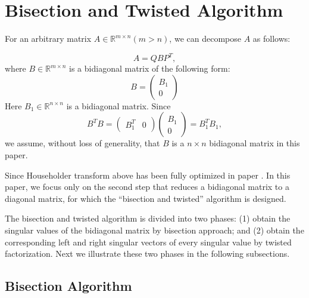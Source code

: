 \section{Bisection and Twisted Algorithm}
\label{sec:algorithm}
For an arbitrary matrix $A\in \mathbb{R}^{m \times n} (m>n)$, we can decompose $A$ as follows:

\begin{equation}
\label{H-transform}
A = Q B P^T ,
\end{equation}
where $B \in \mathbb{R}^{m \times n}$ is a bidiagonal matrix of the following form:
\begin{equation}
B = \left( \begin{array}{c}
      B_1 \\
      0  
\end{array} \right) 
\end{equation}
Here $B_1 \in \mathbb{R}^{n \times n}$ is a bidiagonal matrix. Since 
\[
B^T B = \left( \begin{array}{cc }B_1^T & 0 \end{array} \right) \left( \begin{array}{c} B_1 \\ 0  \end{array} \right) = B_1^T B_1,
\]
we assume, without loss of generality, that $B$ is a $n \times n$ bidiagonal matrix in this paper.
 
Since Householder transform above has been fully optimized in paper \cite{LiuHouseholder}.
In this paper, we focus only on the second step that reduces a bidiagonal matrix to a diagonal matrix, for which the  ``bisection and twisted'' algorithm is designed.

The bisection and twisted algorithm is divided into two phases:
(1) obtain the singular values of the bidiagonal matrix by bisection approach; and
(2) obtain the corresponding left and right singular vectors of every singular value by twisted factorization.
Next we illustrate these two phases in the following subsections.

\subsection{Bisection Algorithm}

